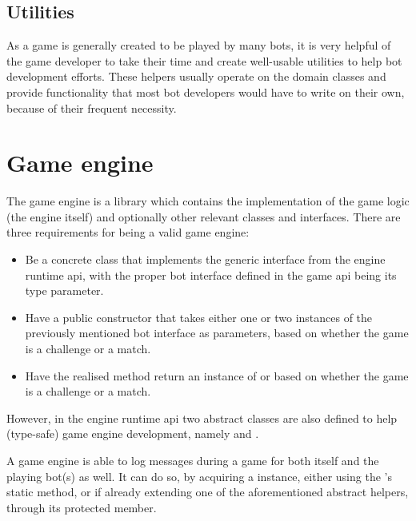 		\subsection*{Utilities}
		
		As a game is generally created to be played by many bots, it is very helpful of the game developer to take their time and create well-usable utilities to help bot development efforts. These helpers usually operate on the domain classes and provide functionality that most bot developers would have to write on their own, because of their frequent necessity.

	\section{Game engine}
	
	The game engine is a library which contains the implementation of the game logic (the engine itself) and optionally other relevant classes and interfaces. There are three requirements for being a valid game engine:
	
	\begin{itemize}
		\item Be a concrete class that implements the generic  interface from the engine runtime api, with the proper bot interface defined in the game api being its type parameter.
		
		\item Have a public constructor that takes either one or two instances of the previously mentioned bot 
		interface as parameters, based on whether the game is a challenge or a match.
		
		\item Have the realised  method return an instance of  or  based on whether the game is a challenge or a match.
	\end{itemize} 
	
	However, in the engine runtime api two abstract classes are also defined to help (type-safe) game engine development, namely  and .
	
	A game engine is able to log messages during a game for both itself and the playing bot(s) as well. It can do so, by acquiring a  instance, either using the 's static  method, or if already extending one of the aforementioned abstract helpers, through its  protected member.  
	
